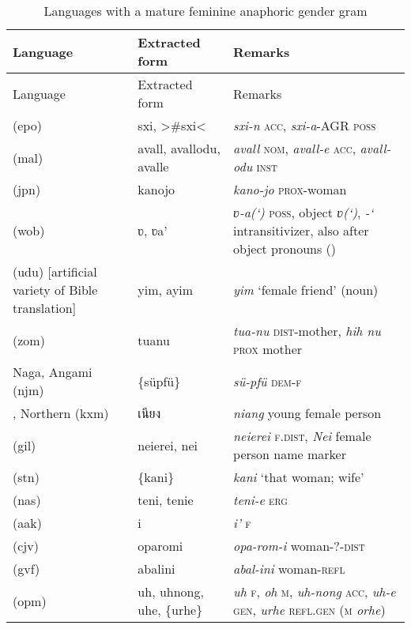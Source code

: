 {\small\begin{longtable}{L{.25\textwidth}L{.25\textwidth}L{.5\textwidth}}
\caption{Languages with a mature feminine anaphoric gender gram}\\
\lsptoprule Language & Extracted form & Remarks\\\midrule\endfirsthead
\midrule    Language & Extracted form & Remarks\\\midrule\endhead
\endfoot\lspbottomrule\endlastfoot
{} (epo)	&	sxi, >\#sxi<	&	\textit{sxi-n} \textsc{acc}, \textit{sxi-a}-AGR \textsc{poss}	\\
 (mal)	&	avall, avallodu, avalle	&	\textit{avall} \textsc{nom}, \textit{avall-e} \textsc{acc}, \textit{avall-odu} \textsc{inst}	\\
 (jpn)	&	kanojo	&	\textit{kano-jo} \textsc{prox}-woman	\\
 (wob)	&	ʋ, ʋa’	&	\textit{ʋ-a(‘)} \textsc{poss}, object \textit{ʋ(‘)}, \textit{-‘} intransitivizer, also after object pronouns (\citealt{Paradis1983})	\\
 (udu) [artificial variety of Bible translation]	&	yim, ayim	&	\textit{yim} ‘female friend’ (noun)	\\
 (zom)	&	tuanu	&	\textit{tua-nu} \textsc{dist}-mother, \textit{hih nu} \textsc{prox} mother	\\
Naga, Angami (njm)	&	\{süpfü\}	&	\textit{sü-pfü} \textsc{dem-f}	\\
, Northern (kxm)	&	\textkhmer{เนียง}	&	\textit{niang} young female person 	\\
 (gil)	&	neierei, nei	&	\textit{neierei} \textsc{f.dist}, \textit{Nei} female person name marker	\\
 (stn)	&	\{kani\}	&	\textit{kani} ‘that woman; wife’	\\
 (nas)	&	teni, tenie	&	\textit{teni-e} \textsc{erg}	\\
 (aak)	&	i\textquotesingle{}	&	\textit{i’} \textsc{f}	\\
 (cjv)	&	oparomi	&	\textit{opa-rom-i} woman-?-\textsc{dist}	\\
 (gvf)	&	abalini	&	\textit{abal-ini} woman-\textsc{refl}	\\
 (opm)	&	uh, uhnong, uhe, \{urhe\}	&	\textit{uh} \textsc{f}, \textit{oh} \textsc{m}, \textit{uh-nong} \textsc{acc}, \textit{uh-e} \textsc{gen}, \textit{urhe} \textsc{refl.gen} (\textsc{m} \textit{orhe})	\\

\end{longtable}}
